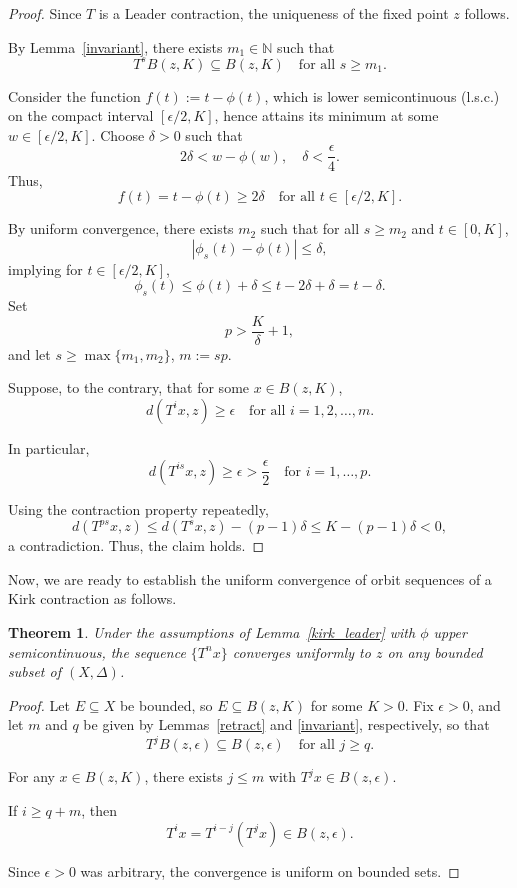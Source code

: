 \documentclass{birkjour}
\newtheorem{thm}{Theorem}[section]
\theoremstyle{definition}
\theoremstyle{remark}
\numberwithin{equation}{section}
\begin{document}
\begin{proof}
Since \(T\) is a Leader contraction, the uniqueness of the fixed point \(z\) follows.

By Lemma~\ref{invariant}, there exists \(m_1 \in \mathbb{N}\) such that
\[
T^{s} B(z, K) \subseteq B(z, K) \quad \text{for all } s \geq m_1.
\]

Consider the function \(f(t) := t - \phi(t)\), which is lower semicontinuous (l.s.c.) on the compact interval \([\epsilon/2, K]\), hence attains its minimum at some \(w \in [\epsilon/2, K]\). Choose \(\delta > 0\) such that
\[
2\delta < w - \phi(w), \quad \delta < \frac{\epsilon}{4}.
\]
Thus,
\[
f(t) = t - \phi(t) \geq 2\delta \quad \text{for all } t \in [\epsilon/2, K].
\]

By uniform convergence, there exists \(m_2\) such that for all \(s \geq m_2\) and \(t \in [0, K]\),
\[
|\phi_s(t) - \phi(t)| \leq \delta,
\]
implying for \(t \in [\epsilon/2, K]\),
\[
\phi_s(t) \leq \phi(t) + \delta \leq t - 2\delta + \delta = t - \delta.
\]
Set
\[
p > \frac{K}{\delta} + 1,
\]
and let \(s \geq \max\{m_1, m_2\}\), \(m := s p\).

Suppose, to the contrary, that for some \(x \in B(z, K)\),
\[
d(T^{i} x, z) \geq \epsilon \quad \text{for all } i = 1, 2, \ldots, m.
\]

In particular,
\[
d(T^{i s} x, z) \geq \epsilon > \frac{\epsilon}{2} \quad \text{for } i = 1, \ldots, p.
\]

Using the contraction property repeatedly,
\[
d(T^{p s} x, z) \leq d(T^{s} x, z) - (p-1) \delta \leq K - (p-1) \delta < 0,
\]
a contradiction. Thus, the claim holds.
\end{proof}
Now, we are ready to establish the uniform convergence of orbit sequences of a Kirk contraction as follows.
\begin{thm}\label{thm:uniformly}
Under the assumptions of Lemma~\ref{kirk_leader} with \(\phi\) upper semicontinuous, the sequence \(\{T^{n} x\}\) converges uniformly to \(z\) on any bounded subset of \((X, \Delta)\).
\end{thm}

\begin{proof}
Let \(E \subseteq X\) be bounded, so \(E \subseteq B(z, K)\) for some \(K > 0\). Fix \(\epsilon > 0\), and let \(m\) and \(q\) be given by Lemmas~\ref{retract} and \ref{invariant}, respectively, so that
\[
T^{j} B(z, \epsilon) \subseteq B(z, \epsilon) \quad \text{for all } j \geq q.
\]

For any \(x \in B(z, K)\), there exists \(j \leq m\) with \(T^{j} x \in B(z, \epsilon)\).

If \(i \geq q + m\), then
\[
T^{i} x = T^{i-j}(T^{j} x) \in B(z, \epsilon).
\]

Since \(\epsilon > 0\) was arbitrary, the convergence is uniform on bounded sets.
\end{proof}
\end{document}
